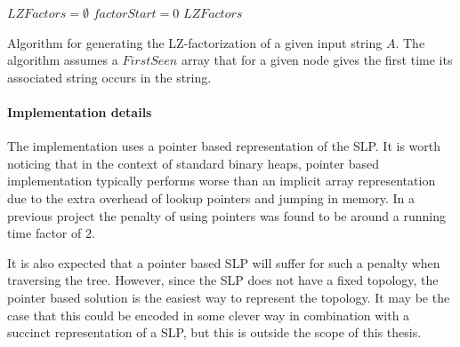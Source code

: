 \documentclass[twoside,11pt,openright]{report}
\begin{document}
\begin{center}
  \begin{algorithm}[!htb]
    \label{alg:compression:lz-factorization}
    $LZFactors = \emptyset$\;
    $factorStart = 0$\;
    \Return $LZFactors$
    \caption{Algorithm for generating the LZ-factorization of a given input string $A$. The algorithm assumes a $FirstSeen$ array that for a given node gives the first time its associated string occurs in the string.}
  \end{algorithm}
\end{center}

\paragraph{Implementation details}
The implementation uses a pointer based representation of the SLP. It is worth noticing that in the context of standard binary heaps, pointer based implementation typically performs worse than an implicit array representation due to the extra overhead of lookup pointers and jumping in memory. In a previous project \cite[p. 9]{AA13Project1} the penalty of using pointers was found to be around a running time factor of $2$.

It is also expected that a pointer based SLP will suffer for such a penalty when traversing the tree. However, since the SLP does not have a fixed topology, the pointer based solution is the easiest way to represent the topology. It may be the case that this could be encoded in some clever way in combination with a succinct representation of a SLP, but this is outside the scope of this thesis.
\end{document}
